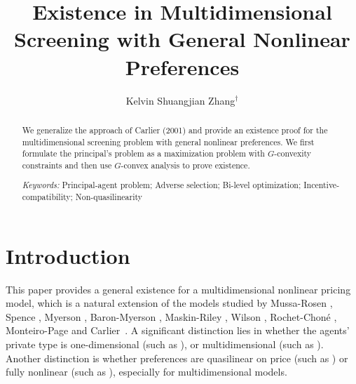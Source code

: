 \documentclass[a4paper, 11pt]{amsart}
\title{Existence in Multidimensional Screening with General Nonlinear Preferences}%
\author{Kelvin Shuangjian Zhang$^\dagger$}\thanks{$^\dagger$Department of Mathematics, University of Toronto, Toronto, Ontario, Canada, M5S 2E4 {\tt szhang@math.toronto.edu}}
\numberwithin{equation}{section}
\theoremstyle{plain}
\theoremstyle{definition}
\theoremstyle{remark}
\begin{document}
\begin{abstract}
	We generalize the approach of Carlier (2001) and provide an existence proof for the multidimensional screening problem with general nonlinear preferences. 
	{We first} formulate the principal's {problem} %
	as a maximization problem with $G$-convexity constraints %
	{and then use $G$-convex analysis to prove existence.} \medskip 

	{\it Keywords:} Principal-agent problem; Adverse selection; Bi-level optimization; Incentive-compatibility; Non-quasilinearity
\end{abstract}

\bigskip

\maketitle

\section{Introduction}\label{section:introduction}
	This paper provides a general existence for a multidimensional nonlinear pricing model,  which is a natural extension of the models studied by Mussa-Rosen \cite{MussaRosen78}, %
	Spence \cite{Spence74, Spence80}, Myerson \cite{Myerson81}, Baron-Myerson \cite{BaronMyerson82}, Maskin-Riley \cite{MaskinRiley84}, Wilson \cite{Wilson93}, Rochet-Chon\'e \cite{RochetChone98}, Monteiro-Page \cite{MonteiroPage98} and  Carlier~\cite{Carlier01}. A significant distinction lies in whether the agents' private type is one-dimensional (such as \cite{MussaRosen78, MaskinRiley84}), or multidimensional (such as \cite{RochetChone98,MonteiroPage98, Carlier01}). Another distinction is whether preferences are quasilinear on price (such as \cite{Armstrong96, Carlier01}) or fully nonlinear (such as \cite{NoldekeSamuelson15p, McCannZhang17}), especially for multidimensional models.  
	\medskip
	
\end{document}
